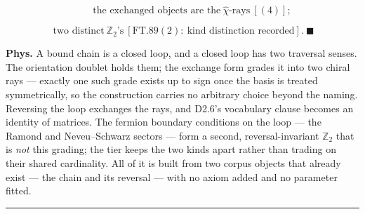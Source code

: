 \begin{theorem}
\[
\qquad \text{the exchanged objects are the}\ \hat\chi\text{-rays}\ [(4)];
\]

\[
\ \text{two distinct}\ \mathbb Z_2\text{'s}\ [\mathrm{FT.89}(2):\ \text{kind distinction recorded}].\ \blacksquare
\]

\textbf{Phys.} A bound chain is a closed loop, and a closed loop has two traversal senses. The orientation doublet holds them; the exchange form grades it into two chiral rays — exactly one such grade exists up to sign once the basis is treated symmetrically, so the construction carries no arbitrary choice beyond the naming. Reversing the loop exchanges the rays, and D2.6's vocabulary clause becomes an identity of matrices. The fermion boundary conditions on the loop — the Ramond and Neveu–Schwarz sectors — form a second, reversal-invariant $\mathbb Z_2$ that is \textit{not} this grading; the tier keeps the two kinds apart rather than trading on their shared cardinality. All of it is built from two corpus objects that already exist — the chain and its reversal — with no axiom added and no parameter fitted.

\vspace{2pt}\noindent\rule{\textwidth}{0.4pt}\vspace{2pt}

\end{theorem}


